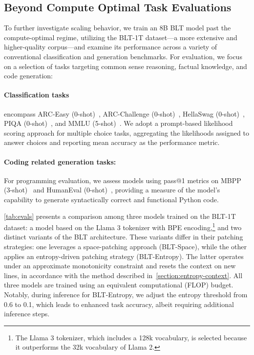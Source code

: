 \subsection{Beyond Compute Optimal Task Evaluations}
\label{section:evals}
To further investigate scaling behavior, we train an 8B {\textsc BLT} model past the compute-optimal regime, utilizing the {\textsc BLT}-1T dataset—a more extensive and higher-quality corpus—and examine its performance across a variety of conventional classification and generation benchmarks. For evaluation, we focus on a selection of tasks targeting common sense reasoning, factual knowledge, and code generation:
\paragraph{Classification tasks} encompass ARC-Easy (0-shot)~\citep{Eval_ARC}, ARC-Challenge (0-shot)~\citep{Eval_ARC}, HellaSwag (0-shot)~\citep{Eval_hellaswag}, PIQA (0-shot)~\citep{Eval_piqa}, and MMLU (5-shot)~\citep{hendrycks2020measuring}. We adopt a prompt-based likelihood scoring approach for multiple choice tasks, aggregating the likelihoods assigned to answer choices and reporting mean accuracy as the performance metric.
\paragraph{Coding related generation tasks:} For programming evaluation, we assess models using pass@1 metrics on MBPP (3-shot)~\citep{Eval_MBPP} and HumanEval (0-shot)~\citep{Eval_HumanEval}, providing a measure of the model’s capability to generate syntactically correct and functional Python code.

\autoref{tab:evals} presents a comparison among three models trained on the {\textsc BLT}-1T dataset: a model based on the Llama 3 tokenizer with BPE encoding,\footnote{The Llama 3 tokenizer, which includes a 128k vocabulary, is selected because it outperforms the 32k vocabulary of Llama 2.} and two distinct variants of the {\textsc BLT} architecture. These variants differ in their patching strategies: one leverages a space-patching approach ({\textsc BLT}-Space), while the other applies an entropy-driven patching strategy ({\textsc BLT}-Entropy). The latter operates under an approximate monotonicity constraint and resets the context on new lines, in accordance with the method described in~\autoref{section:entropy-context}. All three models are trained using an equivalent computational (FLOP) budget. Notably, during inference for {\textsc BLT}-Entropy, we adjust the entropy threshold from 0.6 to 0.1, which leads to enhanced task accuracy, albeit requiring additional inference steps.


